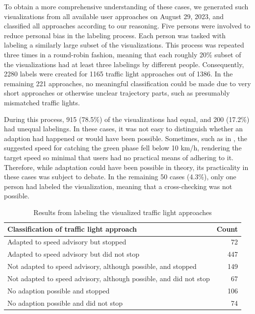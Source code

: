 To obtain a more comprehensive understanding of these cases, we generated such visualizations from all available user approaches on August 29, 2023, and classified all approaches according to our reasoning. Five persons were involved to reduce personal bias in the labeling process. Each person was tasked with labeling a similarly large subset of the visualizations. This process was repeated three times in a round-robin fashion, meaning that each roughly 20\% subset of the visualizations had at least three labelings by different people. Consequently, 2280 labels were created for 1165 traffic light approaches out of 1386. In the remaining 221 approaches, no meaningful classification could be made due to very short approaches or otherwise unclear trajectory parts, such as presumably mismatched traffic lights. 

During this process, 915 (78.5\%) of the visualizations had equal, and 200 (17.2\%) had unequal labelings. In these cases, it was not easy to distinguish whether an adaption had happened or would have been possible. Sometimes, such as in , the suggested speed for catching the green phase fell below 10 km/h, rendering the target speed so minimal that users had no practical means of adhering to it. Therefore, while adaptation could have been possible in theory, its practicality in these cases was subject to debate. In the remaining 50 cases (4.3\%), only one person had labeled the visualization, meaning that a cross-checking was not possible.

\begin{table}[t]
\centering
\begin{tabular}{@{}lr@{}}
\toprule
\textbf{Classification of traffic light approach} & \textbf{Count} \\
\midrule
Adapted to speed advisory but stopped & 72 \\
Adapted to speed advisory but did not stop & 447 \\
Not adapted to speed advisory, although possible, and stopped & 149 \\
Not adapted to speed advisory, although possible, and did not stop & 67 \\
No adaption possible and stopped & 106 \\
No adaption possible and did not stop & 74 \\
\bottomrule
\end{tabular}
\caption{Results from labeling the visualized traffic light approaches}
\label{tab:impacts-labeling-results}
\end{table}

